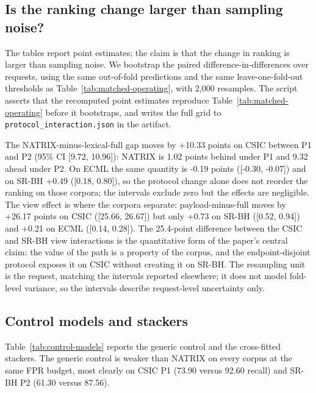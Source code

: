 \documentclass[preprint,11pt]{elsarticle}
\begin{document}
\subsection{Is the ranking change larger than sampling
noise?}\label{is-the-ranking-change-larger-than-sampling-noise}

The tables report point estimates; the claim is that the change in
ranking is larger than sampling noise. We bootstrap the paired
difference-in-differences over requests, using the same out-of-fold
predictions and the same leave-one-fold-out thresholds as Table~\ref{tab:matched-operating}, with
2,000 resamples. The script asserts that the recomputed point estimates
reproduce Table~\ref{tab:matched-operating} before it bootstraps, and writes the full grid to
\texttt{protocol\_\allowbreak{}interaction.\allowbreak{}json} in the artifact.

The NATRIX-minus-lexical-full gap moves by +10.33 points on CSIC between
P1 and P2 (95\% CI {[}9.72, 10.96{]}): NATRIX is 1.02 points behind
under P1 and 9.32 ahead under P2. On ECML the same quantity is -0.19
points ({[}-0.30, -0.07{]}) and on SR-BH +0.49 ({[}0.18, 0.80{]}), so
the protocol change alone does not reorder the ranking on those corpora;
the intervals exclude zero but the effects are negligible. The view
effect is where the corpora separate: payload-minus-full moves by +26.17
points on CSIC ({[}25.66, 26.67{]}) but only +0.73 on SR-BH ({[}0.52,
0.94{]}) and +0.21 on ECML ({[}0.14, 0.28{]}). The 25.4-point difference
between the CSIC and SR-BH view interactions is the quantitative form of
the paper's central claim: the value of the path is a property of the
corpus, and the endpoint-disjoint protocol exposes it on CSIC without
creating it on SR-BH. The resampling unit is the request, matching the
intervals reported elsewhere; it does not model fold-level variance, so
the intervals describe request-level uncertainty only.

\subsection{Control models and
stackers}\label{control-models-and-stackers}

Table~\ref{tab:control-models} reports the generic control and the cross-fitted stackers. The
generic control is weaker than NATRIX on every corpus at the same FPR
budget, most clearly on CSIC P1 (73.90 versus 92.60 recall) and SR-BH P2
(61.30 versus 87.56).
\end{document}
